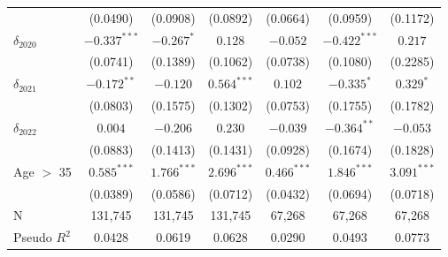 \begin{tabular}{l|ccc|ccc}
                              &        (0.0490) &        (0.0908) &        (0.0892) &             (0.0664) &        (0.0959) &        (0.1172) \\
$\delta_{2020}$               &  $-0.337^{***}$ &      $-0.267^*$ &         $0.128$ &             $-0.052$ &  $-0.422^{***}$ &         $0.217$ \\
                              &        (0.0741) &        (0.1389) &        (0.1062) &             (0.0738) &        (0.1080) &        (0.2285) \\
$\delta_{2021}$               &   $-0.172^{**}$ &        $-0.120$ &   $0.564^{***}$ &              $0.102$ &      $-0.335^*$ &       $0.329^*$ \\
                              &        (0.0803) &        (0.1575) &        (0.1302) &             (0.0753) &        (0.1755) &        (0.1782) \\
$\delta_{2022}$               &         $0.004$ &        $-0.206$ &         $0.230$ &             $-0.039$ &   $-0.364^{**}$ &        $-0.053$ \\
                              &        (0.0883) &        (0.1413) &        (0.1431) &             (0.0928) &        (0.1674) &        (0.1828) \\
Age $>$ 35                    &   $0.585^{***}$ &   $1.766^{***}$ &   $2.696^{***}$ &        $0.466^{***}$ &   $1.846^{***}$ &   $3.091^{***}$ \\
                              &        (0.0389) &        (0.0586) &        (0.0712) &             (0.0432) &        (0.0694) &        (0.0718) \\
N                             &         131,745 &         131,745 &         131,745 &               67,268 &          67,268 &          67,268 \\
Pseudo $R^2$                  &          0.0428 &          0.0619 &          0.0628 &               0.0290 &          0.0493 &          0.0773 \\
\bottomrule
\end{tabular}
